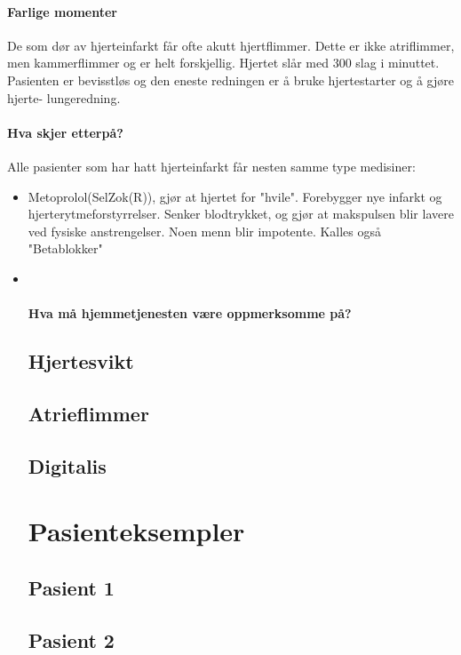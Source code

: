 \documentclass[12pt]{memoir} %
\begin{document}
				\paragraph{Farlige momenter\\}
					De som dør av hjerteinfarkt får ofte akutt hjertflimmer. Dette er ikke atriflimmer, men kammerflimmer og er helt forskjellig. Hjertet slår med 300 slag i minuttet. Pasienten er bevisstløs og den eneste redningen er å bruke hjertestarter og å gjøre hjerte- lungeredning. 
				\paragraph{Hva skjer etterpå?\\}
					Alle pasienter som har hatt hjerteinfarkt får nesten samme type medisiner:
					\begin{itemize}
						\item Metoprolol(SelZok(R)), gjør at hjertet for "hvile". Forebygger nye infarkt og hjerterytmeforstyrrelser. Senker blodtrykket, og gjør at makspulsen blir lavere ved fysiske anstrengelser. Noen menn blir impotente. Kalles også "Betablokker"\\
						\item \\%
				\paragraph{Hva må hjemmetjenesten være oppmerksomme på?\\}

			\subsection{Hjertesvikt}
			\subsection{Atrieflimmer}
			\subsection{Digitalis}
		\section{Pasienteksempler}
			\subsection{Pasient 1}
			\subsection{Pasient 2}

\end{itemize}
\end{document}
